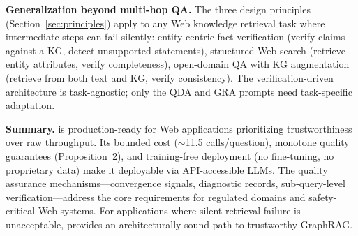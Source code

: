 \smallskip
\noindent\textbf{Generalization beyond multi-hop QA.}
The three design principles (Section~\ref{sec:principles}) apply to any Web
knowledge retrieval task where intermediate steps can fail silently:
entity-centric fact verification (verify claims against a KG, detect unsupported
statements), structured Web search (retrieve entity attributes, verify
completeness), open-domain QA with KG augmentation (retrieve from both text and
KG, verify consistency). The verification-driven architecture is task-agnostic;
only the QDA and GRA prompts need task-specific adaptation.

\smallskip
\noindent\textbf{Summary.}
\sys is production-ready for Web applications prioritizing trustworthiness over
raw throughput. Its bounded cost ($\sim$11.5 calls/question), monotone quality
guarantees (Proposition~2), and training-free deployment (no fine-tuning, no
proprietary data) make it deployable via API-accessible LLMs. The quality
assurance mechanisms---convergence signals, diagnostic records, sub-query-level
verification---address the core requirements for regulated domains and
safety-critical Web systems. For applications where silent retrieval failure is
unacceptable, \sys provides an architecturally sound path to trustworthy GraphRAG.


